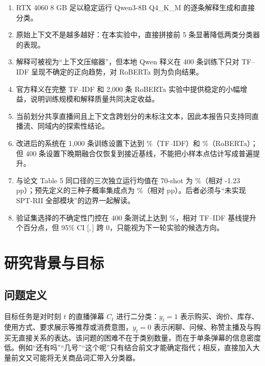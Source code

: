 \documentclass[UTF8,zihao=-4,a4paper]{ctexart}
\begin{document}
\begin{keybox}[核心结论]
\begin{enumerate}[leftmargin=2em,itemsep=0.25em]
  \item RTX 4060 8 GB 足以稳定运行 Qwen3-8B Q4\_K\_M 的逐条解释生成和直接分类。
  \item 原始上下文不是越多越好：在本实验中，直接拼接前 5 条显著降低两类分类器的表现。
  \item 解释可被视为“上下文压缩器”，但本地 Qwen 释义在 400 条训练下只对 TF--IDF 呈现不确定的正向趋势，对 RoBERTa 则为负向结果。
  \item 官方释义在完整 TF--IDF 和 2,000 条 RoBERTa 实验中提供稳定的小幅增益，说明训练规模和解释质量共同决定收益。
  \item 当前划分共享直播间且上下文含跨划分的未标注文本，因此本报告只支持同直播流、同域内的探索性结论。
  \item 改进后的系统在 1,000 条训练设置下达到 \ImproveTFIDFLargeStructuredLate\%（TF--IDF）和 \ImproveRobertaLargeLateFusion\%（RoBERTa）；但 400 条设置下晚期融合仅恢复到接近基线，不能把小样本点估计写成普遍提升。
  \item 与论文 Table 5 同口径的三次独立运行均值在 70-shot 为 \PaperMatchedContentMeanSeventy\%（相对 -1.23 pp）；预先定义的三种子概率集成点为 \PaperMatchedContentEnsembleSeventy\%（相对 \PaperMatchedContentEnsembleDeltaSeventy pp）。后者必须与“未实现 SPT-RII 全部模块”的边界一起解读。
  \item 验证集选择的不确定性门控在 400 条测试上达到 \GateMacroF\%，相对 TF--IDF 基线提升 \GateDeltaPP 个百分点，但 95\% CI [\GateCILowPP,\,\GateCIHighPP] 跨 0，只能视为下一轮实验的候选方向。
\end{enumerate}
\end{keybox}

\section{研究背景与目标}

\subsection{问题定义}

目标任务是对时刻 $t$ 的直播弹幕 $C_t$ 进行二分类：$y_t=1$ 表示购买、询价、库存、使用方式、要求展示等推荐或消费意图，$y_t=0$ 表示闲聊、问候、称赞主播及与购买无直接关系的表达。该问题的困难不在于类别数量，而在于单条弹幕的信息密度低。例如“还有吗”“几号”“这个呢”只有结合前文才能确定指代；相反，直接加入大量前文又可能将无关商品词汇带入分类器。
\end{document}
